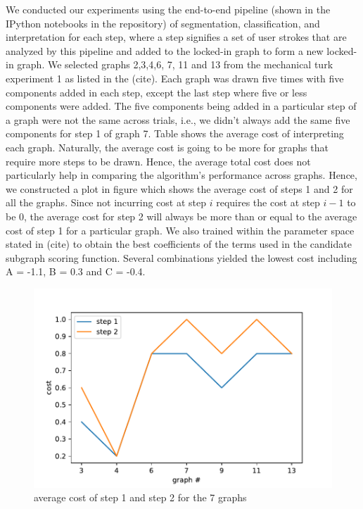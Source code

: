 We conducted our experiments using the end-to-end pipeline (shown in the IPython notebooks in the repository) of segmentation, classification, and interpretation for each step, where a step signifies a set of user strokes that are analyzed by this pipeline and added to the locked-in graph to form a new locked-in graph. We selected graphs 2,3,4,6, 7, 11 and 13 from the mechanical turk experiment 1 as listed in the (cite). Each graph was drawn five times with five components added in each step, except the last step where five or less components were added. The five components being added in a particular step of a graph were not the same across trials, i.e., we didn't always add the same five components for step 1 of graph 7. Table shows the average cost of interpreting each graph. Naturally, the average cost is going to be more for graphs that require more steps to be drawn. Hence, the average total cost does not particularly help in comparing the algorithm's performance across graphs. Hence, we constructed a plot in figure which shows the average cost of steps 1 and 2 for all the graphs. Since not incurring cost at step $i$ requires the cost at step $i-1$ to be 0, the average cost for step 2 will always be more than or equal to the average cost of step 1 for a particular graph. We also trained within the parameter space stated in (cite) to obtain the best coefficients of the terms used in the candidate subgraph scoring function. Several combinations yielded the lowest cost including A = -1.1, B = 0.3 and C = -0.4.

\begin{figure}[!htb]
    \centering
    \includegraphics[scale=0.55]{./img/cost_plot.pdf}
    \caption{average cost of step 1 and step 2 for the 7 graphs}
    \label{fig:cost_plot}
\end{figure}


